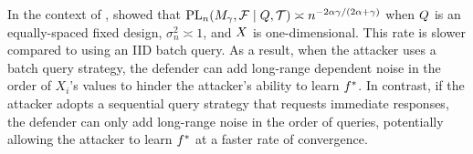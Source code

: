     \begin{remark}
        In the context of , \citet{hall1990nonparametric, wang1996function} showed that $\textrm{PL}_n(M_{\gamma},\mathcal{F}\mid Q,\mathcal{T}) \asymp n^{-2\alpha\gamma/(2\alpha+\gamma)}$ when $Q$ is an equally-spaced fixed design, $\sigma_n^2 \asymp 1$, and $X$ is one-dimensional. This rate is slower compared to using an IID batch query. As a result, when the attacker uses a batch query strategy, the defender can add long-range dependent noise in the order of $X_i$'s values to hinder the attacker's ability to learn $f^*$. In contrast, if the attacker adopts a sequential query strategy that requests immediate responses, the defender can only add long-range noise in the order of queries, potentially allowing the attacker to learn $f^*$ at a faster rate of convergence. 
    \end{remark}

    
    
